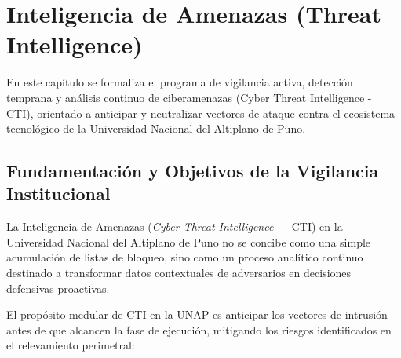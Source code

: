 \chapter{Inteligencia de Amenazas (Threat Intelligence)}
\label{ch:threat_intelligence}

En este capítulo se formaliza el programa de vigilancia activa, detección temprana y análisis continuo de ciberamenazas (Cyber Threat Intelligence - CTI), orientado a anticipar y neutralizar vectores de ataque contra el ecosistema tecnológico de la Universidad Nacional del Altiplano de Puno.



\section{Fundamentación y Objetivos de la Vigilancia Institucional}

La Inteligencia de Amenazas (\textit{Cyber Threat Intelligence} --- CTI) en la Universidad Nacional del Altiplano de Puno no se concibe como una simple acumulación de listas de bloqueo, sino como un proceso analítico continuo destinado a transformar datos contextuales de adversarios en decisiones defensivas proactivas.

El propósito medular de CTI en la UNAP es anticipar los vectores de intrusión antes de que alcancen la fase de ejecución, mitigando los riesgos identificados en el relevamiento perimetral:

